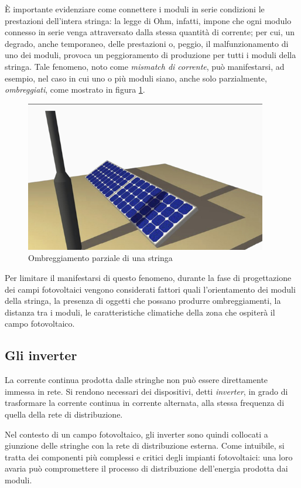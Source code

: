 %
\`E importante evidenziare come connettere i moduli in serie condizioni le 
prestazioni dell'intera stringa: la legge di Ohm, infatti, impone che ogni 
modulo connesso in serie venga attraversato dalla stessa quantit\`a di corrente;
per cui, un degrado, anche temporaneo, delle prestazioni o, peggio, il 
malfunzionamento di uno dei moduli, provoca un peggioramento di produzione 
per tutti i moduli della stringa.
%
Tale fenomeno, noto come \emph{mismatch di corrente}, pu\`o manifestarsi,
ad esempio, nel caso in cui uno o pi\`u moduli siano, anche solo parzialmente, 
\emph{ombreggiati}, come mostrato in figura \ref{ombreggiamento}.
%
\begin{figure}[!h]
\centering
\includegraphics[width=300pt]{img/fv-ombreggiamento.png}
\caption{Ombreggiamento parziale di una stringa}
\label{ombreggiamento}
\end{figure}
%

%
Per limitare il manifestarsi di questo fenomeno, durante la fase di progettazione 
dei campi fotovoltaici vengono considerati fattori quali  l'orientamento 
dei moduli della stringa,  la presenza di oggetti che possano produrre 
ombreggiamenti,  la distanza tra i moduli,  le caratteristiche 
climatiche della zona che ospiter\`a il campo fotovoltaico.
%

%
\subsection{Gli inverter}
La corrente continua prodotta dalle stringhe non pu\`o essere direttamente
immessa in rete. Si rendono necessari dei dispositivi, detti \emph{inverter}, 
in grado di trasformare la corrente continua in corrente alternata, alla 
stessa frequenza di quella della rete di distribuzione.
%

%
Nel contesto di un campo fotovoltaico, gli inverter sono quindi collocati a 
giunzione delle stringhe con la rete di distribuzione esterna. 
%
Come intuibile, si tratta dei componenti pi\`u complessi e critici degli 
impianti fotovoltaici: una loro avaria pu\`o compromettere il processo di 
distribuzione dell'energia prodotta dai moduli.
%

